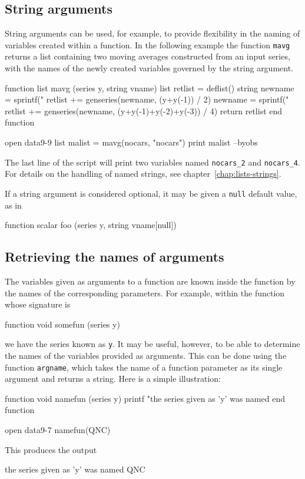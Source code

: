 \subsection{String arguments}

String arguments can be used, for example, to provide flexibility in
the naming of variables created within a function.  In the following
example the function \texttt{mavg} returns a list containing two
moving averages constructed from an input series, with the names of
the newly created variables governed by the string argument.
%
\begin{code}
function list mavg (series y, string vname)
   list retlist = deflist()
   string newname = sprintf("%
   retlist += genseries(newname, (y+y(-1)) / 2)
   newname = sprintf("%
   retlist += genseries(newname, (y+y(-1)+y(-2)+y(-3)) / 4)
   return retlist
end function

open data9-9
list malist = mavg(nocars, "nocars")
print malist --byobs
\end{code}
%
The last line of the script will print two variables named
\verb|nocars_2| and \verb|nocars_4|.  For details on the handling of
named strings, see chapter~\ref{chap:lists-strings}.

If a string argument is considered optional, it may be given a
\texttt{null} default value, as in
%
\begin{code}
function scalar foo (series y, string vname[null])
\end{code}

\subsection{Retrieving the names of arguments}

The variables given as arguments to a function are known inside the
function by the names of the corresponding parameters.  For example,
within the function whose signature is
%
\begin{code}
function void somefun (series y)
\end{code}
%
we have the series known as \texttt{y}.  It may be useful, however, to
be able to determine the names of the variables provided as arguments.
This can be done using the function \texttt{argname}, which takes the
name of a function parameter as its single argument and returns a
string.  Here is a simple illustration:
%
\begin{code}
function void namefun (series y)
  printf "the series given as 'y' was named %
end function

open data9-7
namefun(QNC)
\end{code}
%
This produces the output
%
\begin{code}
the series given as 'y' was named QNC
\end{code}

